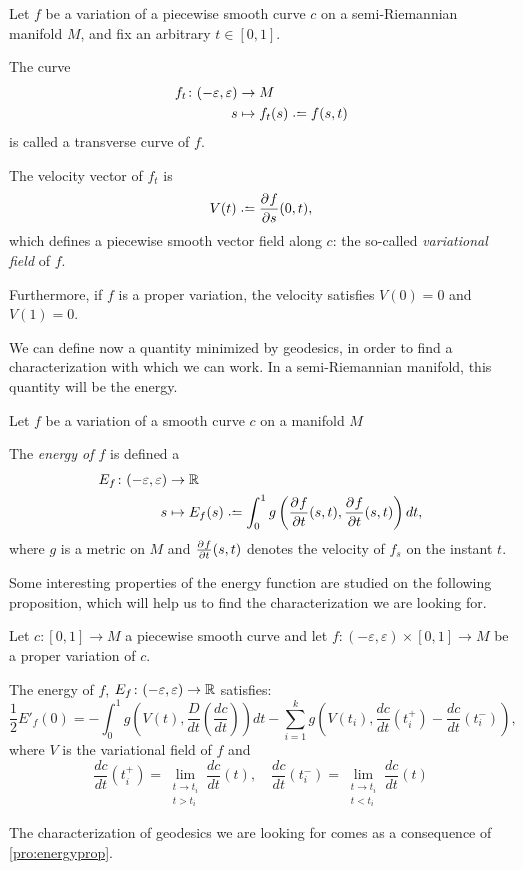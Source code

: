 \begin{definition}
	Let $f$ be a variation of a piecewise smooth curve $c$ on a semi-Riemannian manifold $M$, and fix an arbitrary $t \in [0,1]$.
	
	The curve
	\begin{align*}
		f_t \colon (-\varepsilon, \varepsilon) &\to M \\
		s &\mapsto f_t(s) \defeq f(s,t)
	\end{align*}
is called a transverse curve of $f$.
\end{definition}

The velocity vector of $f_t$ is
\[
V(t) \defeq \pd{f}{s}(0,t),
\]
which defines a piecewise smooth vector field along $c$: the so-called \emph{variational field} of $f$.

Furthermore, if $f$ is a proper variation, the velocity satisfies $V(0) = 0$ and $V(1) = 0$.

We can define now a quantity minimized by geodesics, in order to find a characterization with which we can work. In a semi-Riemannian manifold, this quantity will be the energy.

\begin{definition}
	\label{def:energy}
	Let $f$ be a variation of a smooth curve $c$ on a manifold $M$
	
	The \emph{energy of $f$} is defined a
	\begin{align*}
		E_f \colon (-\varepsilon, \varepsilon) &\to \R \\
		s &\mapsto E_f(s) \defeq \int_0^1 g \left( \pd{f}{t}(s,t), \pd{f}{t}(s,t) \right) dt,
	\end{align*}
	where $g$ is a metric on $M$ and $\frac{\partial^{} f}{\partial t}(s,t)$ denotes the velocity of $f_s$ on the instant $t$.
\end{definition}

Some interesting properties of the energy function are studied on the following proposition, which will help us to find the characterization we are looking for.

\begin{proposition}
	\label{pro:energyprop}
	Let $c \colon [0,1] \to M$ a piecewise smooth curve and let $f \colon (-\varepsilon, \varepsilon) \times [0,1] \to M$ be a proper variation of $c$.
	
	The energy of $f$, $E_f \colon (-\varepsilon, \varepsilon) \to \mathbb{R}$ satisfies:
	\[
		\frac{1}{2} E'_f(0) = - \int_0^1 g\left( V(t), \frac{D}{dt}\left(\frac{dc}{dt}\right) \right)dt - \sum_{i=1}^k g \left( V(t_i), \frac{dc}{dt}(t_i^+) - \frac{dc}{dt}(t_i^-) \right),
	\]
	where $V$ is the variational field of $f$ and
	\[
		\frac{dc}{dt}(t_i^+) = \lim_{\substack{t \to t_i \\ t > t_i}} \frac{dc}{dt}(t), \quad \frac{dc}{dt}(t_i^-) = \lim_{\substack{t \to t_i \\ t < t_i}} \frac{dc}{dt}(t)
	\]
\end{proposition}
The characterization of geodesics we are looking for comes as a consequence of \autoref{pro:energyprop}.

